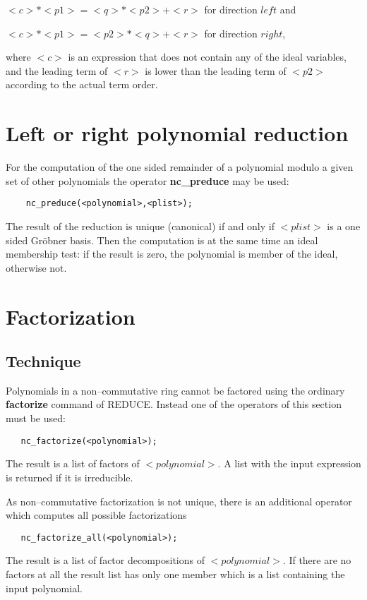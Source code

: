   $<c>*<p1>=<q>*<p2> + <r>$ for direction $left$ and

  $<c>*<p1>=<p2>*<q> + <r>$ for direction $right$,

where $<c>$ is an expression that does not contain any of the
ideal variables, and the leading term of $<r>$ is lower than
the leading term of $<p2>$ according to the actual term order.

\section{Left or right polynomial reduction}

For the computation of the one sided remainder of a polynomial
modulo a given set of other polynomials the operator
{\bf nc\_preduce} may be used:
\begin{verbatim}
    nc_preduce(<polynomial>,<plist>);
\end{verbatim}
The result of the reduction is unique (canonical) if
and only if $<plist>$ is a one sided Gr\"obner basis.
Then the computation is at the same time an ideal
membership test: if the result is zero, the
polynomial is member of the ideal, otherwise not.

\section{Factorization}

\subsection{Technique}

Polynomials in a non--commutative ring cannot be factored
using the ordinary {\bf factorize} command of {\small REDUCE}.
Instead one of the operators of this section must be used:
\begin{verbatim}
   nc_factorize(<polynomial>);
\end{verbatim}
The result is a list of factors of $<polynomial>$. A list
with the input expression is returned if it is irreducible.

As non--commutative factorization is not unique, there is
an additional operator which computes all possible factorizations
\begin{verbatim}
   nc_factorize_all(<polynomial>);
\end{verbatim}
The result is a list of factor decompositions of $<polynomial>$.
If there are no factors at all the result list has only one
member which is a list containing the input polynomial.

